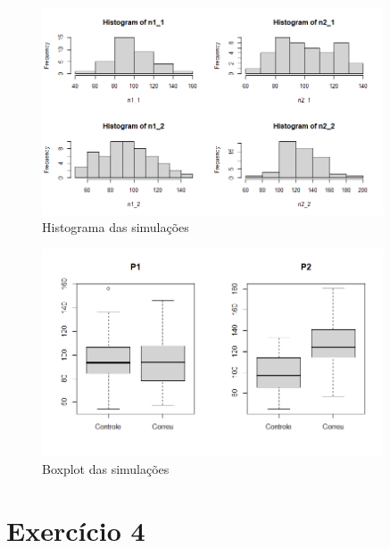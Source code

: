 \documentclass{article}
\begin{document}
\begin{figure}[h]
    \centering
    \includegraphics[width=0.9\textwidth]{figures/ex3.png} %
    \caption{Histograma das simulações}
    \label{fig3}
\end{figure}

\begin{figure}[h]
    \centering
    \includegraphics[width=0.9\textwidth]{figures/bp_ex3.png} %
    \caption{Boxplot das simulações}
    \label{fig4}
\end{figure}

\section{Exercício 4}
\end{document}
